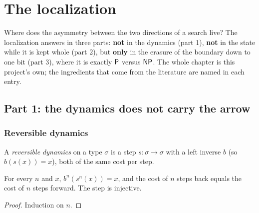\chapter{The localization}
\label{chap:localization}

Where does the asymmetry between the two directions of a search live? The localization answers
in three parts: \textbf{not} in the dynamics (part 1), \textbf{not} in the state while it is kept
whole (part 2), but \textbf{only} in the erasure of the boundary down to one bit (part 3), where it
is exactly $\mathsf{P}$ versus $\mathsf{NP}$. The whole chapter is this project's own; the ingredients that come
from the literature are named in each entry.

\section{Part 1: the dynamics does not carry the arrow}

\subsection{Reversible dynamics}

\begin{definition}
  \label{def:reversible-dynamics}
  \leanok
  A \emph{reversible dynamics} on a type $\sigma$ is a step $s : \sigma \to \sigma$ with a left
  inverse $b$ (so $b(s(x)) = x$), both of the same cost per step.
  \own{}
\end{definition}

\begin{theorem}
  \label{thm:back-iterate}
  \leanok
  For every $n$ and $x$, $b^n(s^n(x)) = x$, and the cost of $n$ steps back equals the cost of $n$
  steps forward. The step is injective.
  \own{}
\end{theorem}

\begin{proof}
  \leanok
  Induction on $n$.
\end{proof}

